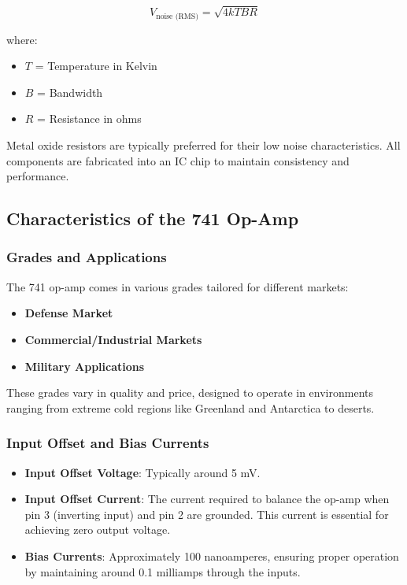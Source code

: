 \documentclass[a4paper,9pt,twoside,openany,twocolumn]{memoir}
\begin{document}
\[
V_{\text{noise (RMS)}} = \sqrt{4kTBR}
\]

where:
\begin{itemize}
    \item \( T \) = Temperature in Kelvin
    \item \( B \) = Bandwidth
    \item \( R \) = Resistance in ohms
\end{itemize}

Metal oxide resistors are typically preferred for their low noise characteristics. All components are fabricated into an IC chip to maintain consistency and performance.

\subsection{Characteristics of the 741 Op-Amp}

\subsubsection{Grades and Applications}

The 741 op-amp comes in various grades tailored for different markets:
\begin{itemize}
    \item \textbf{Defense Market}
    \item \textbf{Commercial/Industrial Markets}
    \item \textbf{Military Applications}
\end{itemize}

These grades vary in quality and price, designed to operate in environments ranging from extreme cold regions like Greenland and Antarctica to deserts.

\subsubsection{Input Offset and Bias Currents}

\begin{itemize}
    \item \textbf{Input Offset Voltage}: Typically around 5 mV.
    \item \textbf{Input Offset Current}: The current required to balance the op-amp when pin 3 (inverting input) and pin 2 are grounded. This current is essential for achieving zero output voltage.
    \item \textbf{Bias Currents}: Approximately 100 nanoamperes, ensuring proper operation by maintaining around 0.1 milliamps through the inputs.
\end{itemize}
\end{document}
